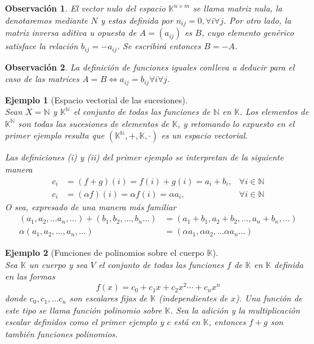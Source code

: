 \documentclass[b5paper, 11pt]{book}
\newcommand{\0}{\mathbf{0}}
\newcommand{\K}{\mathds{K}}
\newcommand{\N}{\mathds{N}}
\newtheorem{obs}{Observación}[chapter]
\theoremstyle{estiloB}
\theoremstyle{estiloC}
\theoremstyle{estiloD}
\theoremstyle{estiloE}
\newtheorem{ejem}{Ejemplo}[chapter]
\begin{document}
\begin{obs}
El vector nulo del espacio $\K^{n \times m}$ se llama matriz nula, la denotaremos mediante $N$ y estas definida por $n_{ij}=0, \forall i \forall j$. Por otro lado, la matriz inversa aditiva u opuesta de $A= (a_{ij})$ es $B$, cuyo elemento genérico satisface la relación $b_{ij}= -a_{ij}$. Se escribirá entonces $B= -A$.
\end{obs}

\begin{obs}
La definición de funciones iguales conlleva a deducir para el caso de las matrices $A=B \Longleftrightarrow a_{ij}= b_{ij} \forall i \forall j$.
\end{obs}

\begin{ejem}[Espacio vectorial de las sucesiones]\textcolor{white}{.}\\
Sean $X= \N$ y $\K^{\N}$ el conjunto de todas las funciones de $\N$ en $\K$. Los elementos de $\K^{\N}$ son todas las sucesiones de elementos de $\K$, y retomando lo expuesto en el primer ejemplo resulta que $(\K^{\N}, +, \K, \cdot)$ es un espacio vectorial.

Las definiciones \textit{(i)} y \textit{(ii)} del primer ejemplo se interpretan de la siguiente manera
\begin{align*}
c_i &= (f+g)(i)= f(i)+ g(i)= a_i + b_i, &\forall i \in \N\\
c_i &= (\alpha f)(i)= \alpha f(i)= \alpha a_i, &\forall i \in \N
\end{align*}
O sea, expresado de una manera más familiar
\begin{align*}
(a_1, a_2, \ldots a_n, \ldots)+ (b_1, b_2, \ldots , b_n \ldots)&= (a_1+ b_1, a_2+ b_2, \ldots , a_n+ b_n, \ldots)\\
\alpha (a_1, a_2, \ldots , a_n, \ldots) &= (\alpha a_1, \alpha a_2, \ldots \alpha a_n \ldots)
\end{align*}
\end{ejem}

\begin{ejem}[Funciones de polinomios sobre el cuerpo $\K$]\textcolor{white}{.}\\
Sea $\K$ un cuerpo y sea $V$ el conjunto de todas las funciones $f$ de $\K$ en $\K$ definida en las formas
\[
f(x)= c_0+ c_1x+ c_2x^{2}\cdots + c_nx^{n}
\]
donde $c_0, c_1, \ldots c_n$ son escalares fijas de $\K$ (independientes de $x$). Una función de este tipo se llama \textit{función polinomio} sobre $\K$. Sea la adición y la multiplicación escalar definidos como el primer ejemplo y $c$ está en $\K$, entonces $f+g$ son también funciones polinomios.
\end{ejem}
\end{document}
